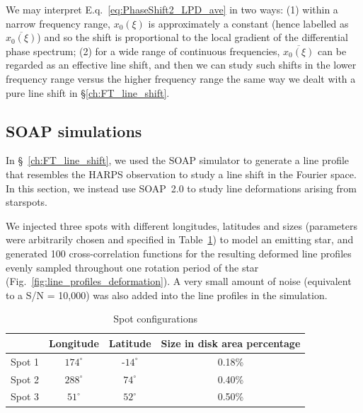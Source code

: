 We may interpret E.q.~\ref{eq:PhaseShift2_LPD_ave} in two ways: (1) within a narrow frequency range, $x_0(\xi)$ is approximately a constant (hence labelled as $\overline{x_0(\xi)}$) and so the shift is proportional to the local gradient of the differential phase spectrum; (2) for a wide range of continuous frequencies, $\overline{x_0(\xi)}$ can be regarded as an effective line shift, and then we can study such shifts in the lower frequency range versus the higher frequency range the same way we dealt with a pure line shift in \S\ref{ch:FT_line_shift}. 



\subsection{SOAP simulations}
\label{sec:Simulations}

In \S~\ref{ch:FT_line_shift}, we used the SOAP simulator to generate a line profile that resembles the HARPS observation to study a line shift in the Fourier space. In this section, we instead use SOAP~2.0 to study line deformations arising from starspots. 

We injected three spots with different longitudes, latitudes and sizes (parameters were arbitrarily chosen and specified in Table~\ref{table:spot_configurations}) to model an emitting star, and generated 100 cross-correlation functions for the resulting  deformed line profiles evenly sampled throughout one rotation period of the star (Fig.~\ref{fig:line_profiles_deformation}). A very small amount of noise (equivalent to a S/N = 10,000) was also added into the line profiles in the simulation. 

\begin{table}[htbp]
\centering
\begin{tabular}{|c|c|c|c|}
\hline 
 & Longitude & Latitude & Size in disk area percentage\\ 
\hline 
Spot 1 & $174^\circ$ & -$14^\circ$ & 0.18\% \\ 
\hline 
Spot 2 & $288^\circ$ & $74^\circ$  & 0.40\% \\ 
\hline 
Spot 3 & $51^\circ$  & $52^\circ$  & 0.50\% \\ 
\hline 
\end{tabular} 
\caption{Spot configurations}
\label{table:spot_configurations}
\end{table}

